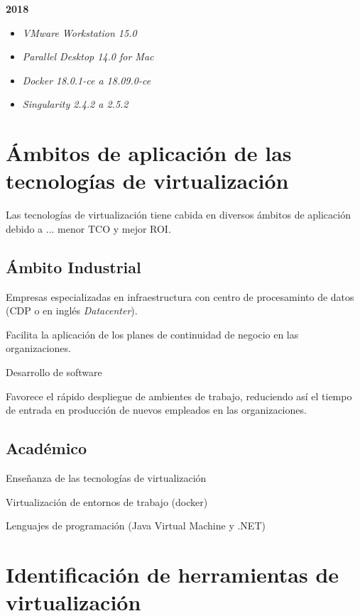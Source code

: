 \textbf{2018}\\
\begin{itemize}
	\item \textit{VMware Workstation 15.0}\\
	\item \textit{Parallel Desktop 14.0 for Mac}\\		
	\item \textit{Docker 18.0.1-ce a 18.09.0-ce} \\
	\item \textit{Singularity 2.4.2 a 2.5.2} \parencite{Singularity2018}\\
\end{itemize}


\section{Ámbitos de aplicación de las tecnologías de virtualización} \label{ambitos}

Las tecnologías de virtualización tiene cabida en diversos ámbitos de aplicación debido a ... menor TCO y mejor ROI. 



\subsection{Ámbito Industrial}
Empresas especializadas en infraestructura con centro de procesaminto de datos (CDP o en inglés \textit{Datacenter}).

Facilita la aplicación de los planes de continuidad de negocio en las organizaciones. 

Desarrollo de software

Favorece el rápido despliegue de ambientes de trabajo, reduciendo así el tiempo de entrada en producción de nuevos empleados en las organizaciones. 




\subsection{Académico}

Enseñanza de las tecnologías de virtualización


Virtualización de entornos de trabajo (docker)


Lenguajes de programación (Java Virtual Machine y .NET)


\section{Identificación de herramientas de virtualización} \label{herramientas}



